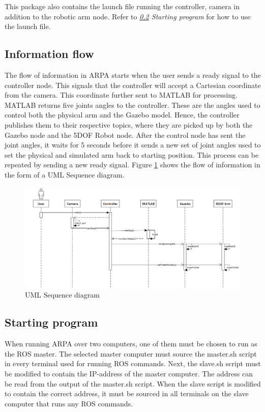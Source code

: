 \documentclass[11pt,a4paper, titlepage]{article}
\begin{document}
This package also contains the launch file running the controller, camera in addition to the robotic arm node. Refer to \textit{\ref{startup} Starting program} for how to use the launch file.
	
	
	\subsection{Information flow}
	The flow of information in ARPA starts when the user sends a ready signal to the controller node. This signals that the controller will accept a Cartesian coordinate from the camera. This coordinate  further sent to MATLAB for processing. MATLAB returns five joints angles to the controller. These are the angles used to control both the physical arm and the Gazebo model. Hence, the controller publishes them to their respective topics, where they are picked up by both the Gazebo node and the 5DOF Robot node. After the control node has sent the joint angles, it waits for 5 seconds before it sends a new set of joint angles used to set the physical and simulated arm back to starting position. This process can be repeated by sending a new ready signal. Figure \ref{fig:seq-diagram} shows the flow of information in the form of a UML Sequence diagram.
	
	
	\begin{figure}[H]
		\includegraphics[width=\linewidth]{../Diagrams/SequenceDiagram-v1.png}
		\caption{UML Sequence diagram}
		\label{fig:seq-diagram}
	\end{figure}
	
	\subsection{Starting program}
	\label{startup}
	
	When running ARPA over two computers, one of them must be chosen to run as the ROS master. The selected master computer must source the master.sh script in every terminal used for running ROS commands. Next, the slave.sh script must be modified to contain the IP-address of the master computer. The address can be read from the output of the master.sh script. When the slave script is modified to contain the correct address, it must be sourced in all terminals on the slave computer that runs any ROS commands.
	
\end{document}
